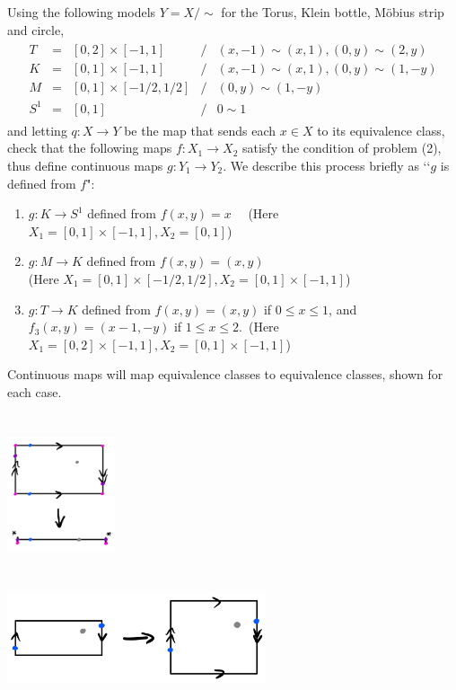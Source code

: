 \documentclass{jhwhw}
\begin{document}
\problem{}%
\noindent
Using the following models $Y = X/\sim$ for the Torus, Klein bottle, M\"obius strip and circle,	
\begin{eqnarray*}
	\begin{array}{ccccl}
		T & = & [0,2]\times [-1,1] & / & (x,-1)\sim (x,1), (0,y)\sim (2,y)\\
		K & = & [0,1]\times [-1,1]  & / & (x,-1) \sim (x,1), (0,y)\sim (1,-y)\\
		M & = & [0,1]\times [-1/2,1/2] & / & (0,y)\sim (1,-y)\\
		S^1 & = & [0,1] & / & 0\sim 1
	\end{array}
\end{eqnarray*}
and letting $q:X\to Y$ be the map that sends each $x\in X$ to its equivalence class,
check that the following maps $f:X_1\to X_2$ satisfy the condition of problem (2), thus define continuous maps $g:Y_1\to Y_2$.  We describe this process briefly  as  \lq\lq $g$ is defined from $f$":
\begin{enumerate}
	
	\item $g: K \to S^1$ defined from $ f(x,y) = x$ \ \ (Here $X_1= [0,1]\times [-1,1] , X_2 = [0,1]$)
	\item $g: M \to K$ defined from $f (x,y) = (x,y)$ \\ (Here $X_1= [0,1]\times [-1/2,1/2] ,X_2 = [0,1]\times [-1,1]$)
	\item $g:T\to K$ defined from $f(x,y) = (x,y)$ if $0\le x\le 1$, and $f_3(x,y) = (x-1,-y)$ if $1\le x\le 2$.\  (Here $X_1 = [0,2]\times [-1,1], X_2 = [0,1]\times [-1,1] $)
\end{enumerate}
\solution{}
\noindent Continuous maps will map equivalence classes to equivalence classes, shown for each case.

\part{}%
\begin{center}
	\includegraphics[height=1.35in]{5_3a.png}
\end{center}


\part{}%
\begin{center}
	\includegraphics[height=1.05in]{5_3b.png}
\end{center}
\end{document}
